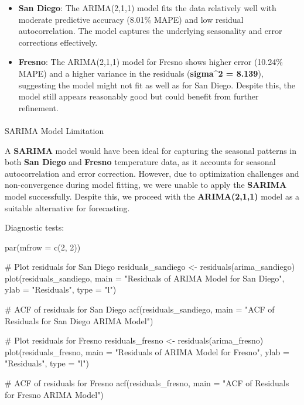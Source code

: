 \documentclass[
  11pt,
]{article}
\makeatletter
\let\oldparagraph\paragraph
\renewcommand{\paragraph}{
    \@ifstar
      \xxxParagraphStar
      \xxxParagraphNoStar
  }
\newcommand{\xxxParagraphStar}[1]{\oldparagraph*{#1}\mbox{}}
\newcommand{\xxxParagraphNoStar}[1]{\oldparagraph{#1}\mbox{}}
\newenvironment{Shaded}{\begin{snugshade}}{\end{snugshade}}
\newcommand{\AttributeTok}[1]{\textcolor[rgb]{0.40,0.45,0.13}{#1}}
\newcommand{\CommentTok}[1]{\textcolor[rgb]{0.37,0.37,0.37}{#1}}
\newcommand{\DecValTok}[1]{\textcolor[rgb]{0.68,0.00,0.00}{#1}}
\newcommand{\FunctionTok}[1]{\textcolor[rgb]{0.28,0.35,0.67}{#1}}
\newcommand{\NormalTok}[1]{\textcolor[rgb]{0.00,0.23,0.31}{#1}}
\newcommand{\OtherTok}[1]{\textcolor[rgb]{0.00,0.23,0.31}{#1}}
\newcommand{\StringTok}[1]{\textcolor[rgb]{0.13,0.47,0.30}{#1}}
\makeatother
\begin{document}
\begin{itemize}
\item
  \textbf{San Diego}: The ARIMA(2,1,1) model fits the data relatively
  well with moderate predictive accuracy (8.01\% MAPE) and low residual
  autocorrelation. The model captures the underlying seasonality and
  error corrections effectively.
\item
  \textbf{Fresno}: The ARIMA(2,1,1) model for Fresno shows higher error
  (10.24\% MAPE) and a higher variance in the residuals
  (\textbf{sigma\^{}2 = 8.139}), suggesting the model might not fit as
  well as for San Diego. Despite this, the model still appears
  reasonably good but could benefit from further refinement.
\end{itemize}

\paragraph{SARIMA Model Limitation}\label{sarima-model-limitation}

A \textbf{SARIMA} model would have been ideal for capturing the seasonal
patterns in both \textbf{San Diego} and \textbf{Fresno} temperature
data, as it accounts for seasonal autocorrelation and error correction.
However, due to optimization challenges and non-convergence during model
fitting, we were unable to apply the \textbf{SARIMA} model successfully.
Despite this, we proceed with the \textbf{ARIMA(2,1,1)} model as a
suitable alternative for forecasting.

Diagnostic tests:

\begin{Shaded}
\begin{Highlighting}[]
\FunctionTok{par}\NormalTok{(}\AttributeTok{mfrow =} \FunctionTok{c}\NormalTok{(}\DecValTok{2}\NormalTok{, }\DecValTok{2}\NormalTok{)) }

\CommentTok{\# Plot residuals for San Diego}
\NormalTok{residuals\_sandiego }\OtherTok{\textless{}{-}} \FunctionTok{residuals}\NormalTok{(arima\_sandiego)}
\FunctionTok{plot}\NormalTok{(residuals\_sandiego, }\AttributeTok{main =} \StringTok{"Residuals of ARIMA Model for San Diego"}\NormalTok{, }\AttributeTok{ylab =} \StringTok{"Residuals"}\NormalTok{, }\AttributeTok{type =} \StringTok{"l"}\NormalTok{)}

\CommentTok{\# ACF of residuals for San Diego}
\FunctionTok{acf}\NormalTok{(residuals\_sandiego, }\AttributeTok{main =} \StringTok{"ACF of Residuals for San Diego ARIMA Model"}\NormalTok{)}

\CommentTok{\# Plot residuals for Fresno}
\NormalTok{residuals\_fresno }\OtherTok{\textless{}{-}} \FunctionTok{residuals}\NormalTok{(arima\_fresno)}
\FunctionTok{plot}\NormalTok{(residuals\_fresno, }\AttributeTok{main =} \StringTok{"Residuals of ARIMA Model for Fresno"}\NormalTok{, }\AttributeTok{ylab =} \StringTok{"Residuals"}\NormalTok{, }\AttributeTok{type =} \StringTok{"l"}\NormalTok{)}

\CommentTok{\# ACF of residuals for Fresno}
\FunctionTok{acf}\NormalTok{(residuals\_fresno, }\AttributeTok{main =} \StringTok{"ACF of Residuals for Fresno ARIMA Model"}\NormalTok{)}
\end{Highlighting}
\end{Shaded}
\end{document}
